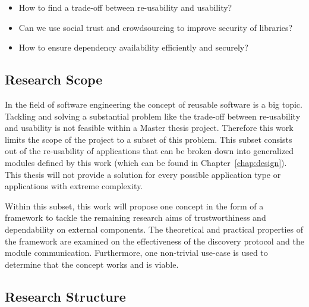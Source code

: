\begin{itemize}
	\item How to find a trade-off between re-usability and usability?
	\item Can we use social trust and crowdsourcing to improve security of libraries?
	\item How to ensure dependency availability efficiently and securely?
\end{itemize}


\subsection{Research Scope}


 In the field of software engineering the concept of reusable software is a big topic. Tackling and solving a substantial problem like the trade-off between re-usability and usability is not feasible within a Master thesis project. Therefore this work limits the scope of the project to a subset of this problem. This subset consists out of the re-usability of applications that can be broken down into generalized modules defined by this work (which can be found in Chapter~\ref{chap:design}). This thesis will not provide a solution for every possible application type or applications with extreme complexity.

Within this subset, this work will propose one concept in the form of a framework to tackle the remaining research aims of trustworthiness and dependability on external components. The theoretical and practical properties of the framework are examined on the effectiveness of the discovery protocol and the module communication. Furthermore, one non-trivial use-case is used to determine that the concept works and is viable. 


\subsection{Research Structure}

